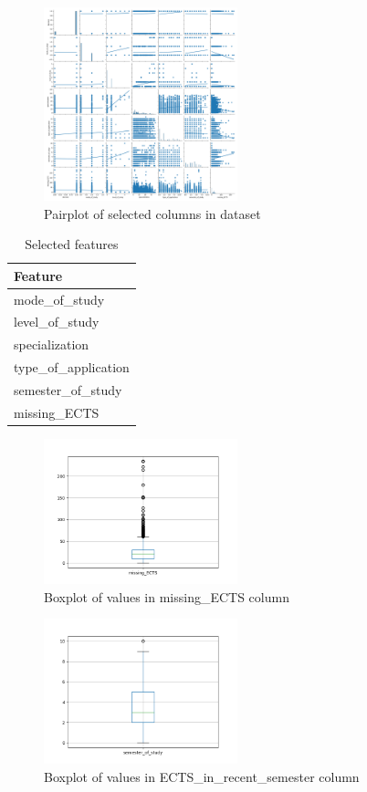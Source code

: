 \begin{figure}
    \includegraphics[width=0.5\textwidth]{img/pairplot_selected_columns.png}
    \caption{Pairplot of selected columns in dataset}
    \label{fig:selected_features_pariplot}
\end{figure}

\begin{table}
    \centering
    \caption{Selected features}
    \label{tab:selected_features}
    \begin{tabular}{l}
        \hline
        \textbf{Feature}\\
        \hline
        mode\_of\_study\\
        level\_of\_study\\
        specialization\\
        type\_of\_application\\
        semester\_of\_study\\
        missing\_ECTS\\
        \hline
    \end{tabular}
\end{table}

\begin{figure}
    \includegraphics[width=0.5\textwidth]{img/box_missing.png}
    \caption{Boxplot of values in missing\_ECTS column}
    \label{fig:box_missing}
\end{figure}

\begin{figure}
    \includegraphics[width=0.5\textwidth]{img/box_semester.png}
    \caption{Boxplot of values in ECTS\_in\_recent\_semester column}
    \label{fig:box_semester}
\end{figure}
